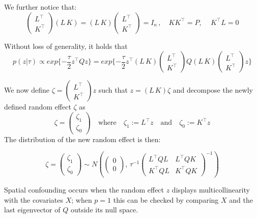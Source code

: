 \documentclass[openany]{book}
\begin{document}
We further notice that:
$$
\begin{pmatrix} L^{\top} \\ K^{\top}\end{pmatrix} (L \, K) = (L \, K) \begin{pmatrix} L^{\top} \\ K^{\top}\end{pmatrix} = I_n \, , \quad KK^{\top} = P, \, \quad K^{\top}L = 0 
$$

Without loss of generality, it holds that
$$
p(z | \tau) \propto exp \lbrace -\dfrac{\tau}{2} z^{\top} Q z \rbrace = 
exp \lbrace -\dfrac{\tau}{2} z^{\top} (L \, K) \begin{pmatrix} L^{\top} \\ K^{\top}\end{pmatrix} 
Q (L \, K) \begin{pmatrix} L^{\top} \\ K^{\top}\end{pmatrix} z \rbrace
$$

We now define $\zeta = \begin{pmatrix} L^{\top} \\ K^{\top} \end{pmatrix} z$ such that $z = (L \, K) \zeta$ and decompose the newly defined random effect $\zeta$ as
$$
\zeta = \begin{pmatrix} \zeta_1 \\ \zeta_0 \end{pmatrix} \quad \text{where} \quad  \zeta_1 := L^{\top}z \quad \text{and} \quad \zeta_0 := K^{\top}z
$$ 
The distribution of the new random effect is then:

$$
\zeta = \begin{pmatrix} \zeta_1 \\ \zeta_0\end{pmatrix} \sim N \left(\begin{pmatrix} 0 \\ 0 \end{pmatrix}, \, \tau^{-1} \begin{pmatrix} L^{\top}QL & L^{\top}QK \\ K^{\top}QL & K^{\top}QK \end{pmatrix}^{-1} \right)
$$

Spatial confounding occurs when the random effect $z$ displays multicollinearity with the covariates $X$; when $p = 1$ this can be checked by comparing $X$ and the last eigenvector of $Q$ outside its null space. 
\end{document}
